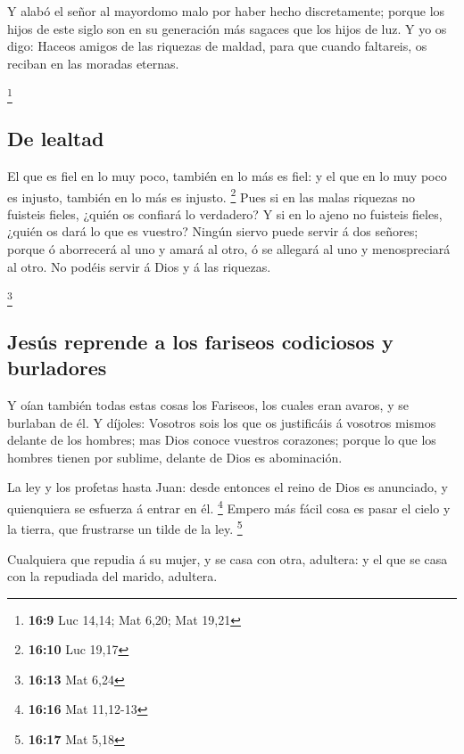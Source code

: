  Y alabó el señor al mayordomo malo por haber hecho
discretamente; porque los hijos de este siglo son en su generación más
sagaces que los hijos de luz.  Y yo os digo: Haceos amigos
de las riquezas de maldad, para que cuando faltareis, os reciban en las
moradas eternas.

\footnote{\textbf{16:9} Luc 14,14; Mat 6,20; Mat 19,21}

\hypertarget{de-lealtad}{%
\subsection{De lealtad}\label{de-lealtad}}

 El que es fiel en lo muy poco, también en lo más es fiel:
y el que en lo muy poco es injusto, también en lo más es injusto.
\footnote{\textbf{16:10} Luc 19,17}  Pues si en las malas
riquezas no fuisteis fieles, ¿quién os confiará lo verdadero?
 Y si en lo ajeno no fuisteis fieles, ¿quién os dará lo que
es vuestro?  Ningún siervo puede servir á dos señores;
porque ó aborrecerá al uno y amará al otro, ó se allegará al uno y
menospreciará al otro. No podéis servir á Dios y á las riquezas.

\footnote{\textbf{16:13} Mat 6,24}

\hypertarget{jesuxfas-reprende-a-los-fariseos-codiciosos-y-burladores}{%
\subsection{Jesús reprende a los fariseos codiciosos y
burladores}\label{jesuxfas-reprende-a-los-fariseos-codiciosos-y-burladores}}

 Y oían también todas estas cosas los Fariseos, los cuales
eran avaros, y se burlaban de él.  Y díjoles: Vosotros sois
los que os justificáis á vosotros mismos delante de los hombres; mas
Dios conoce vuestros corazones; porque lo que los hombres tienen por
sublime, delante de Dios es abominación.

 La ley y los profetas hasta Juan: desde entonces el reino
de Dios es anunciado, y quienquiera se esfuerza á entrar en él.
\footnote{\textbf{16:16} Mat 11,12-13}  Empero más fácil
cosa es pasar el cielo y la tierra, que frustrarse un tilde de la ley.
\footnote{\textbf{16:17} Mat 5,18}

 Cualquiera que repudia á su mujer, y se casa con otra,
adultera: y el que se casa con la repudiada del marido, adultera.

